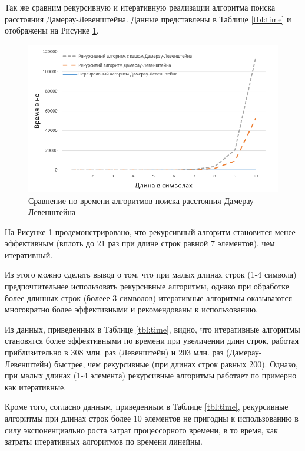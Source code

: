 \documentclass[a4paper,14pt, unknownkeysallowed]{bmstu}
\begin{document}
Так же сравним рекурсивную и итеративную реализации алгоритма поиска расстояния Дамерау-Левенштейна. Данные представлены в Таблице \ref{tbl:time} и отображены на Рисунке \ref{plt:time_02}.

\begin{figure}[h]
	\centering
	\includegraphics[height=0.3\textheight]{img/diag_02.png}
	\caption{Сравнение по времени алгоритмов поиска расстояния Дамерау-Левенштейна}
	\label{plt:time_02}
\end{figure}

На Рисунке \ref{plt:time_02} продемонстрировано, что рекурсивный алгоритм становится менее эффективным (вплоть до 21 раз при длине строк равной 7 элементов), чем итеративный.

Из этого можно сделать вывод о том, что при малых длинах строк (1-4 символа) предпочтительнее использовать рекурсивные алгоритмы, однако при обработке более длинных строк (болеее 3 символов) итеративные алгоритмы оказываются многократно более эффективными и рекомендованы к использованию.

Из данных, приведенных в  Таблице \ref{tbl:time}, видно, что итеративные алгоритмы становятся более эффективными по времени при увеличении длин строк, работая приблизительно в 308 млн. раз (Левенштейн) и 203 млн. раз (Дамерау-Левенштейн) быстрее, чем рекурсивные (при длинах строк равных 200). Однако, при малых длинах (1-4 элемента) рекурсивные алгоритмы работает по примерно как итеративные.

Кроме того, согласно данным, приведенным в Таблице \ref{tbl:time}, рекурсивные алгоритмы при длинах строк более 10 элементов не пригодны к использованию в силу экспоненциально роста затрат процессорного времени, в то время, как затраты итеративных алгоритмов по времени линейны.
\end{document}
